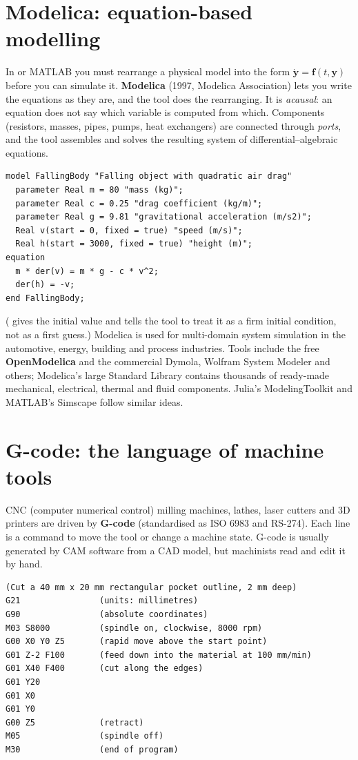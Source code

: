 \section{Modelica: equation-based modelling}
\label{sec:modelica}

In \py or MATLAB you must rearrange a physical model into the form
$\dot{\mathbf{y}} = \mathbf{f}(t, \mathbf{y})$ before you can simulate it. \textbf{Modelica}
(1997, Modelica Association) lets you write the equations as they are, and the tool does
the rearranging. It is \emph{acausal}: an equation  does not
say which variable is computed from which. Components (resistors, masses, pipes, pumps,
heat exchangers) are connected through \emph{ports}, and the tool assembles and solves the
resulting system of differential--algebraic equations.
\begin{lstlisting}[language=Modelica]
model FallingBody "Falling object with quadratic air drag"
  parameter Real m = 80 "mass (kg)";
  parameter Real c = 0.25 "drag coefficient (kg/m)";
  parameter Real g = 9.81 "gravitational acceleration (m/s2)";
  Real v(start = 0, fixed = true) "speed (m/s)";
  Real h(start = 3000, fixed = true) "height (m)";
equation
  m * der(v) = m * g - c * v^2;
  der(h) = -v;
end FallingBody;
\end{lstlisting}
( gives the initial value and  tells the tool to treat it
as a firm initial condition, not as a first guess.) Modelica is used for multi-domain system simulation in the automotive, energy, building and
process industries. Tools include the free \textbf{OpenModelica} and the commercial Dymola,
Wolfram System Modeler and others; Modelica's large Standard Library contains thousands of
ready-made mechanical, electrical, thermal and fluid components. Julia's ModelingToolkit
and MATLAB's Simscape follow similar ideas.

\section{G-code: the language of machine tools}

CNC (computer numerical control) milling machines, lathes, laser cutters and 3D printers
are driven by \textbf{G-code} (standardised as ISO 6983 and RS-274). Each line is a command
to move the tool or change a machine state. G-code is usually generated by CAM software
from a CAD model, but machinists read and edit it by hand.
\begin{lstlisting}[language=GCode]
(Cut a 40 mm x 20 mm rectangular pocket outline, 2 mm deep)
G21                (units: millimetres)
G90                (absolute coordinates)
M03 S8000          (spindle on, clockwise, 8000 rpm)
G00 X0 Y0 Z5       (rapid move above the start point)
G01 Z-2 F100       (feed down into the material at 100 mm/min)
G01 X40 F400       (cut along the edges)
G01 Y20
G01 X0
G01 Y0
G00 Z5             (retract)
M05                (spindle off)
M30                (end of program)
\end{lstlisting}


